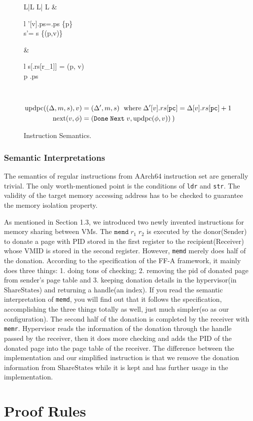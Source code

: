 \documentclass[a4paper]{article}
\newcommand*{\SSS}{\text{ShareStates}}
\newcommand*{\PID}{\text{PID}}
\newcommand*{\VMID}{\text{VMID}}
\newcommand*{\instr}[1]{\texttt{#1}}
\newcommand*{\updpc}{\text{updpc}}
\begin{document}
\begin{figure}[h!]
\begin{adjustwidth}{-1cm}{}
\begin{tabular}[t]{L|L L| L}
                                 &\!\!\!\!\! \begin{array}{l}
                                               \Delta'[v].ps=\Delta[v].ps \cup \{p\}\\
                                               s'= s \setminus \{(p,v)\}
                                             \end{array}
                      &\leftshift\begin{array}{l}
                                   s[\Delta[v].rs[r_{1}]] = (p, v)\\
                                   \land p \notin \Delta[v].ps
                                 \end{array} \\\hline
    \end{tabular}
  \end{adjustwidth}
  \begin{align*}
    \updpc((\Delta,m,s),v)&=(\Delta',m,s)\ \; \text{where}\; \Delta'[v].rs[\mathtt{pc}] = \Delta[v].rs[\mathtt{pc}]+1\\
    \nextt(v,\phi) &= \DNXT{v}{\phi}
  \end{align*}
  \caption{Instruction Semantics.}
\end{figure}

\subsubsection{Semantic Interpretations}
The semantics of regular instructions from AArch64 instruction set are generally
trivial. The only worth-mentioned point is the conditions of \instr{ldr} and
\instr{str}. The validity of the target memory accessing address has to be
checked to guarantee the memory isolation property.

As mentioned in Section 1.3, we introduced two newly invented instructions for
memory sharing between VMs. The $\instr{memd}\; r_{1}\; r_{2}$ is executed by
the donor(Sender) to donate a page with $\PID$ stored in the first register to
the recipient(Receiver) whose $\VMID$ is stored in the second register. However,
\instr{memd} merely does half of the donation. According to the specification of
the FF-A framework, it mainly does three things: 1. doing tons of checking; 2.
removing the pid of donated page from sender's page table and 3. keeping
donation details in the hypervisor(in $\SSS$) and returning a handle(an index).
If you read the semantic interpretation of \instr{memd}, you will find out that
it follows the specification, accomplishing the three things totally as well,
just much simpler(so as our configuration). The second half of the donation is
completed by the receiver with \instr{memr}. Hypervisor reads the information of
the donation through the handle passed by the receiver, then it does more
checking and adds the $\PID$ of the donated page into the page table of the
receiver. The difference between the implementation and our simplified
instruction is that we remove the donation information from $\SSS$ while it is
kept and has further usage in the implementation.

\section{Proof Rules}
\end{document}
